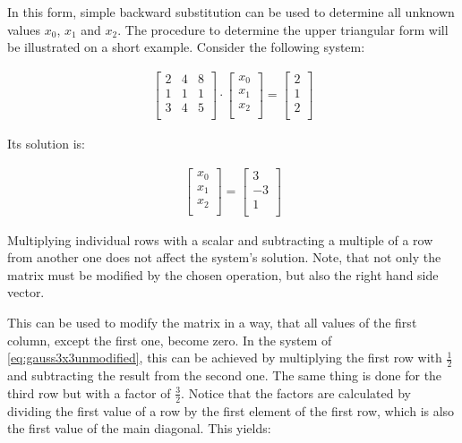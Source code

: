 \documentclass[]{scrartcl}
\begin{document}
In this form, simple backward substitution can be used to determine all unknown values $x_0$, $x_1$ and $x_2$.
The procedure to determine the upper triangular form will be illustrated on a short example.
Consider the following system:

\begin{align}
\label{eq:gauss3x3unmodified}
\begin{bmatrix}
	2&4&8\\
	1&1&1\\
	3&4&5\\
\end{bmatrix}
\cdot
\begin{bmatrix}
x_0\\
x_1\\
x_2\\
\end{bmatrix}
=
\begin{bmatrix}
2\\
1\\
2\\
\end{bmatrix}
\end{align}

Its solution is:

\begin{align*}
\begin{bmatrix}
	x_0\\
	x_1\\
	x_2\\
\end{bmatrix}
=
\begin{bmatrix}
	3\\
	-3\\
	1\\
\end{bmatrix}
\end{align*}


Multiplying individual rows with a scalar and subtracting a multiple of a row from another one does not affect the system's solution.
Note, that not only the matrix must be modified by the chosen operation, but also the right hand side vector.


This can be used to modify the matrix in a way, that all values of the first column, except the first one, become zero.
In the system of \cref{eq:gauss3x3unmodified}, this can be achieved by multiplying the first row with $\frac{1}{2}$ and subtracting the result from the second one.
The same thing is done for the third row but with a factor of $\frac{3}{2}$.
Notice that the factors are calculated by dividing the first value of a row by the first element of the first row, which is also the first value of the main diagonal.
This yields:
\end{document}
